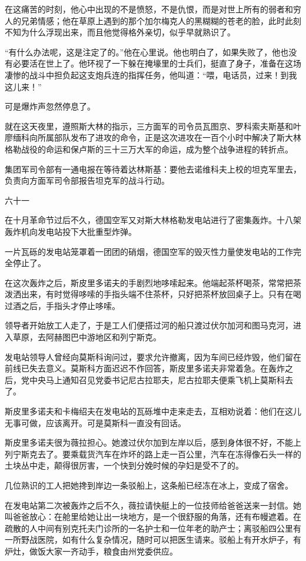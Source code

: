在这痛苦的时刻，他心中出现的不是愤怒，不是仇恨，而是对世上所有的弱者和穷人的兄弟情感；他在草原上遇到的那个加尔梅克人的黑糊糊的苍老的脸，此时此刻不知为什么浮现出来，而且他觉得格外亲切，似乎早就熟识了。

“有什么办法呢，这是注定了的。”他在心里说。他也明白了，如果失败了，他也没有必要活在世上了。他环视了一下躲在掩壕里的士兵们，挺直了身子，准备在这场凄惨的战斗中担负起这支炮兵连的指挥任务，他叫道：“喂，电话员，过来！到我这儿来！”

可是爆炸声忽然停息了。

就在这天夜里，遵照斯大林的指示，三方面军的司令员瓦图京、罗科索夫斯基和叶廖缅科向所属部队发布了进攻的命令，正是这次进攻在一百个小时中解决了斯大林格勒战役的命运和保卢斯的三十三万大军的命运，成为整个战争进程的转折点。

集团军司令部有一通电报在等待着达林斯基：要他去诺维科夫上校的坦克军里去，负责向方面军司令部报告坦克军的战斗行动。

六十一

在十月革命节过后不久，德国空军又对斯大林格勒发电站进行了密集轰炸。十八架轰炸机向发电站投下大批重型炸弹。

一片瓦砾的发电站笼罩着一团团的硝烟，德国空军的毁灭性力量使发电站的工作完全停止了。

在这次轰炸之后，斯皮里多诺夫的手剧烈地哆嗦起来。他端起茶杯喝茶，常常把茶泼洒出来，有时觉得哆嗦的手指头端不住茶杯，只好把茶杯放回桌子上。只有在喝过酒之后，手指头才停止哆嗦。

领导者开始放工人走了，于是工人们便搭过河的船只渡过伏尔加河和图马克河，进入草原，去阿赫图巴中游地区和列宁斯克。

发电站领导人曾经向莫斯科询问过，要求允许撤离，因为车间已经炸毁，他们留在前线已失去意义。莫斯科方面迟迟不作回答，斯皮里多诺夫非常着急。在轰炸之后，党中央马上通知召见党委书记尼古拉耶夫，尼古拉耶夫便乘飞机上莫斯科去了。

斯皮里多诺夫和卡梅绍夫在发电站的瓦砾堆中走来走去，互相劝说着：他们在这儿无事可做，应该离开。可是莫斯科一直没有回话。

斯皮里多诺夫很为薇拉担心。她渡过伏尔加到左岸以后，感到身体很不好，不能上列宁斯克去了。要乘载货汽车在炸坏的路上走一百公里，汽车在冻得像石头一样的土块丛中走，颠得很厉害，一个快到分娩时候的孕妇是受不了的。

几位熟识的工人把她搀到岸边一条驳船上，这条船已经冻在冰上，变成了宿舍。

在发电站第二次被轰炸之后不久，薇拉请快艇上的一位技师给爸爸送来一封信。她叫爸爸放心：在舱里给她让出一块地方，是一个很舒服的角落，还有布幔遮着。在疏散的人中间有别克托夫门诊所的一名护士和一位年老的助产士；离驳船四公里有一所野战医院，如有什么复杂情况，随时可以把医生请来。驳船上有开水炉子，有炉灶，做饭大家一齐动手，粮食由州党委供应。

